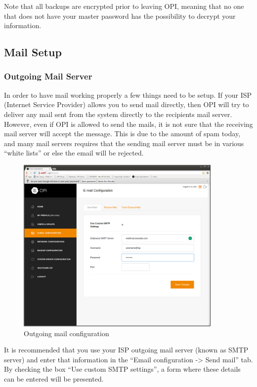 \documentclass[12pt,a4paper,titlepage]{article}
\begin{document}
Note that all backups are encrypted prior to leaving OPI, meaning that no one that does not have your master password has the possibility to decrypt your information.

\subsection{Mail Setup}
\subsubsection{Outgoing Mail Server}
In order to have mail working properly a few things need to be setup.
If your ISP (Internet Service Provider) allows you to send mail directly, then OPI will try to deliver any mail sent from the system directly to the recipients mail server. However, even if OPI is allowed to send the mails, it is not sure that the receiving mail server will accept the message. This is due to the amount of spam today, and many mail servers requires that the sending mail server must be in various ``white lists'' or else the email will be rejected.
\begin{figure}[h]
\centering
\includegraphics[width=10cm]{./img/smtp_config}
\caption{Outgoing mail configuration}
\end{figure}

It is recommended that you use your ISP outgoing mail server (known as SMTP server) and enter that information in the ``Email configuration -> Send mail'' tab. By checking the box ``Use custom SMTP settings'', a form where these details can be entered will be presented.
\end{document}
